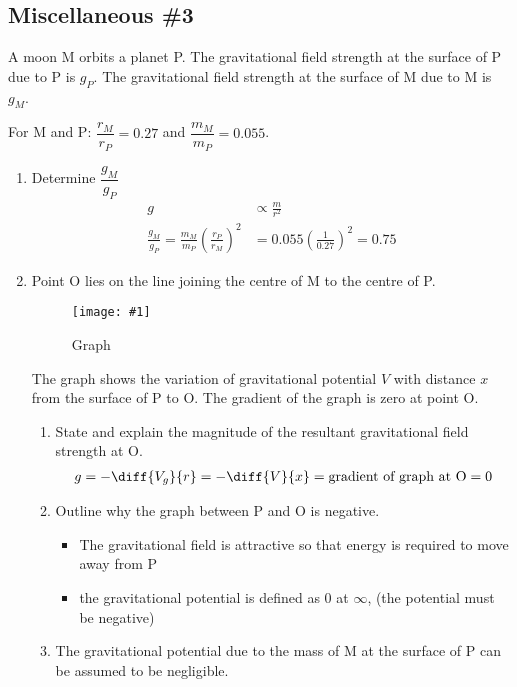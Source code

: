 \documentclass[a4paper,12pt]{article}
\newcommand{\img}[4]{\begin{center}
  \begin{figure}[H]
    \centering
    \texttt{[image: \#1]}
    \caption{#3}
    \label{fig:#4}
  \end{figure}
\end{center}}
\begin{document}
\pagebreak

\subsection{Miscellaneous \#3}

A moon M orbits a planet P. The gravitational field strength at the surface of P due to P is $g_P$. The gravitational field strength at the surface of M due to M is $g_M$.

For M and P: $\dfrac{r_M}{r_P} = 0.27$ and $\dfrac{m_M}{m_P} = 0.055$.

\begin{enumerate}[label=(\alph*)]
  \item Determine $\dfrac{g_M}{g_P}$
        \begin{align*}
          g                                                                & \propto \frac{m}{r^2}                       \\
          \frac{g_M}{g_P}  = \frac{m_M}{m_P}\left(\frac{r_P}{r_M}\right)^2 & = 0.055\left(\frac{1}{0.27}\right)^2 = 0.75
        \end{align*}
  \item Point O lies on the line joining the centre of M to the centre of P.
        \img{ex/7.png}{0.8}{Graph}{ex7}
        The graph shows the variation of gravitational potential $V$ with distance $x$ from the surface of P to O. The gradient of the graph is zero at point O.
        \begin{enumerate}[label=(\roman*)]
          \item State and explain the magnitude of the resultant gravitational field strength at O.
                \begin{align*}
                  g = -\diff{V_g}{r} = -\diff{V}{x} = \text{gradient of graph at O} = 0
                \end{align*}
          \item Outline why the graph between P and O is negative.
                \begin{itemize}
                  \item The gravitational field is attractive so that energy is required to move away from P
                  \item the gravitational potential is defined as 0 at $\infty$, (the potential must be negative)
                \end{itemize}
          \item The gravitational potential due to the mass of M at the surface of P can be assumed to be negligible.


\end{enumerate}
\end{enumerate}
\end{document}
